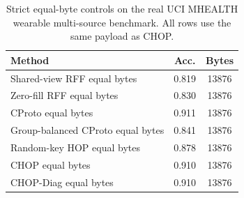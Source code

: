 \begin{table}[t]
\centering
\caption{Strict equal-byte controls on the real UCI MHEALTH wearable multi-source benchmark. All rows use the same payload as CHOP.}
\label{tab:strict-equal-byte-mhealth}
\begin{tabular}{lcc}
\toprule
Method & Acc. & Bytes \\
\midrule
Shared-view RFF equal bytes & 0.819 & 13876 \\
Zero-fill RFF equal bytes & 0.830 & 13876 \\
CProto equal bytes & 0.911 & 13876 \\
Group-balanced CProto equal bytes & 0.841 & 13876 \\
Random-key HOP equal bytes & 0.878 & 13876 \\
CHOP equal bytes & 0.910 & 13876 \\
CHOP-Diag equal bytes & 0.910 & 13876 \\
\bottomrule
\end{tabular}
\end{table}
